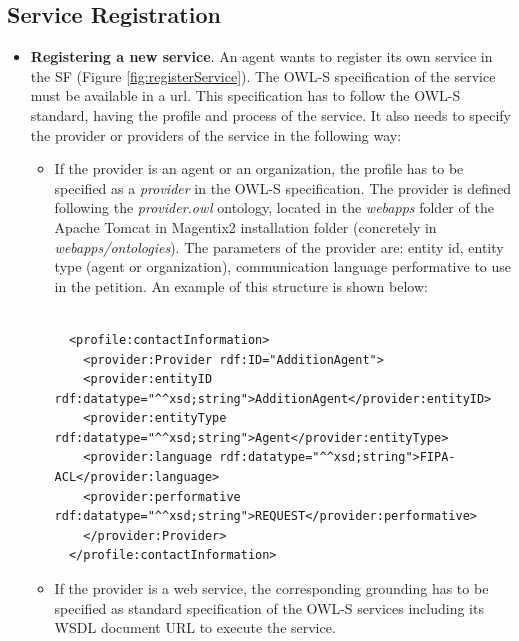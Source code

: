 


\subsection{Service Registration}

\begin{itemize}
\item \textbf{Registering a new service}. An agent wants to register its own service in the SF (Figure \ref{fig:registerService}). The OWL-S specification of the service must be available in a url. This specification has to follow the OWL-S standard, having the profile and process of the service. It also needs to specify the provider or providers of the service in the following way:
\begin{itemize}
 \item If the provider is an agent or an organization,  the profile  has to be specified   as a \textit{provider} in the OWL-S specification. The provider is defined following the \textit{provider.owl} ontology, located in the \textit{webapps} folder of the Apache Tomcat in Magentix2 installation folder (concretely in \textit{webapps/ontologies}). The parameters of the provider are: entity id, entity type (agent or organization), communication language performative to use in the petition. An example of this structure is shown below:

 \begin{lstlisting}

  <profile:contactInformation>
    <provider:Provider rdf:ID="AdditionAgent">
	<provider:entityID rdf:datatype="^^xsd;string">AdditionAgent</provider:entityID>
	<provider:entityType rdf:datatype="^^xsd;string">Agent</provider:entityType>
	<provider:language rdf:datatype="^^xsd;string">FIPA-ACL</provider:language>
	<provider:performative rdf:datatype="^^xsd;string">REQUEST</provider:performative>
    </provider:Provider>
  </profile:contactInformation>

 \end{lstlisting}

 \item If the provider is a web service,  the corresponding grounding has to be specified  as standard specification of the OWL-S services including its WSDL document URL to execute the service.

\end{itemize}



\end{itemize}
